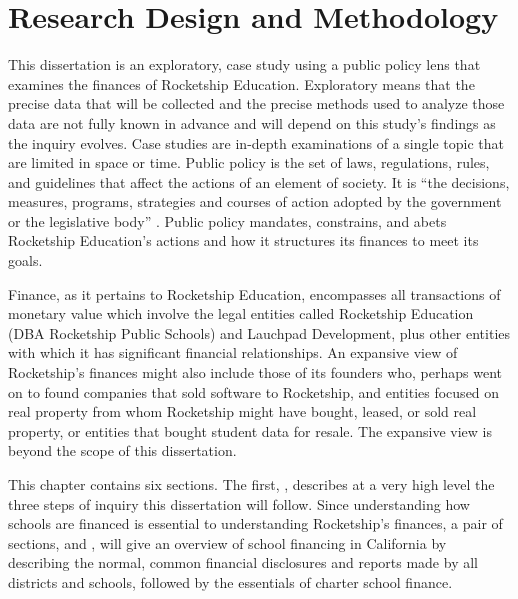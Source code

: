 
\chapter{Research Design and Methodology}\label{ch:methods}
This dissertation is an exploratory, case study using a public policy lens that examines the finances of Rocketship Education. Exploratory means that the precise data that will be collected and the precise methods used to analyze those data are not fully known in advance and will depend on this study's findings as the inquiry evolves. Case studies are in-depth examinations of a single topic that are limited in space or time. Public policy is the set of laws, regulations, rules, and guidelines that affect the actions of an element of society. It is ``the decisions, measures, programs, strategies and courses of action adopted by the government or the legislative body'' \parencite[3]{Knill.Tosun2020}. Public policy mandates, constrains, and abets Rocketship Education's actions and how it structures its finances to meet its goals.

Finance, as it pertains to Rocketship Education, encompasses all transactions of monetary value which involve the legal entities called Rocketship Education (DBA Rocketship Public Schools) and Lauchpad Development, plus other entities with which it has significant financial relationships. An expansive view of Rocketship's finances might also include those of its founders who, perhaps went on to found companies that sold software to Rocketship, and entities focused on real property from whom Rocketship might have bought, leased, or sold real property, or entities that bought student data for resale. The expansive view is beyond the scope of this dissertation.

This chapter contains six sections. The first, ,
describes at a very high level the three steps of inquiry this dissertation will follow. Since understanding how schools are financed is essential to understanding Rocketship's finances, a pair of sections,  and , will give an overview of school financing in California by describing the normal, common financial disclosures and reports made by all districts and schools, followed by the essentials of charter school finance. 

